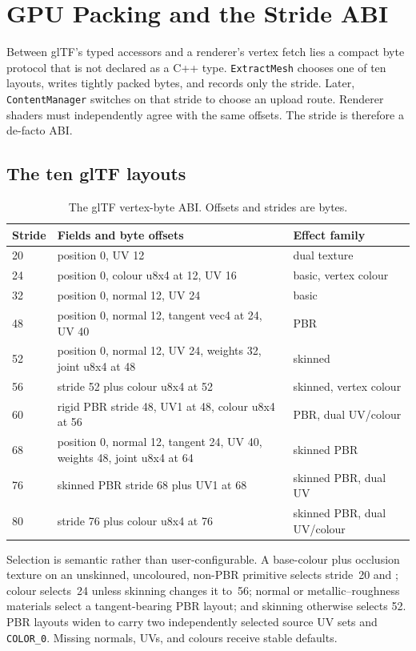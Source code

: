 \chapter{GPU Packing and the Stride ABI}
\label{ch:gpu-packing}

Between glTF's typed accessors and a renderer's vertex fetch lies a compact byte protocol that
is not declared as a C++ type. \texttt{ExtractMesh} chooses one of ten layouts, writes tightly
packed bytes, and records only the stride. Later, \texttt{ContentManager} switches on that
stride to choose an upload route. Renderer shaders must independently agree with the same
offsets. The stride is therefore a de-facto ABI.

\section{The ten glTF layouts}

\begin{table}[htbp]
\centering
\small
\begin{tabularx}{\textwidth}{@{}lXl@{}}
\toprule
Stride & Fields and byte offsets & Effect family \\
\midrule
20 & position 0, UV 12 & dual texture \\
24 & position 0, colour u8x4 at 12, UV 16 & basic, vertex colour \\
32 & position 0, normal 12, UV 24 & basic \\
48 & position 0, normal 12, tangent vec4 at 24, UV 40 & PBR \\
52 & position 0, normal 12, UV 24, weights 32, joint u8x4 at 48 & skinned \\
56 & stride 52 plus colour u8x4 at 52 & skinned, vertex colour \\
60 & rigid PBR stride 48, UV1 at 48, colour u8x4 at 56 & PBR, dual UV/colour \\
68 & position 0, normal 12, tangent 24, UV 40, weights 48, joint u8x4 at 64 & skinned PBR \\
76 & skinned PBR stride 68 plus UV1 at 68 & skinned PBR, dual UV \\
80 & stride 76 plus colour u8x4 at 76 & skinned PBR, dual UV/colour \\
\bottomrule
\end{tabularx}
\caption{The glTF vertex-byte ABI. Offsets and strides are bytes.}
\label{tab:gltf-stride-abi}
\end{table}

Selection is semantic rather than user-configurable. A base-colour plus occlusion texture on an
unskinned, uncoloured, non-PBR primitive selects stride~20 and
; colour selects~24 unless skinning changes it to~56; normal or
metallic--roughness materials select a tangent-bearing PBR layout; and skinning otherwise selects
52. PBR layouts widen to carry two independently selected source UV sets and \texttt{COLOR\_0}.
Missing normals, UVs, and colours receive stable defaults.

